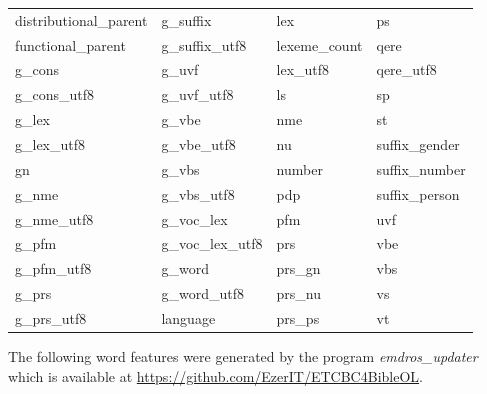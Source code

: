 \documentclass[11pt,oneside,a4paper]{memoir}
\begin{document}
\begin{center}
  \begin{tabular}{llll}
    distributional\_parent & g\_suffix         & lex           & ps             \\
    functional\_parent     & g\_suffix\_utf8   & lexeme\_count & qere           \\
    g\_cons                & g\_uvf            & lex\_utf8     & qere\_utf8     \\
    g\_cons\_utf8          & g\_uvf\_utf8      & ls            & sp             \\
    g\_lex                 & g\_vbe            & nme           & st             \\
    g\_lex\_utf8           & g\_vbe\_utf8      & nu            & suffix\_gender \\
    gn                     & g\_vbs            & number        & suffix\_number \\
    g\_nme                 & g\_vbs\_utf8      & pdp           & suffix\_person \\
    g\_nme\_utf8           & g\_voc\_lex       & pfm           & uvf            \\
    g\_pfm                 & g\_voc\_lex\_utf8 & prs           & vbe            \\
    g\_pfm\_utf8           & g\_word           & prs\_gn       & vbs            \\
    g\_prs                 & g\_word\_utf8     & prs\_nu       & vs             \\
    g\_prs\_utf8           & language          & prs\_ps       & vt             \\
  \end{tabular}
\end{center}

The following word features were generated by the program
\emph{emdros\_updater} which is available at
\url{https://github.com/EzerIT/ETCBC4BibleOL}.
\end{document}

